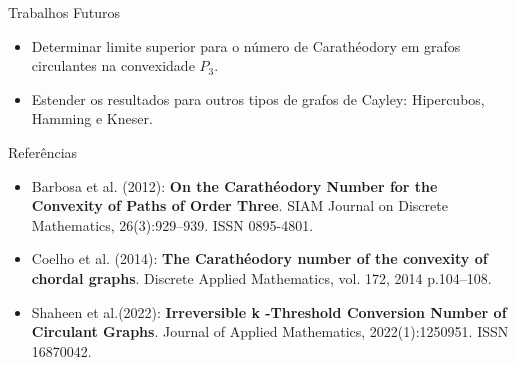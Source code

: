\documentclass{beamer}
\begin{document}
\begin{frame}{Trabalhos Futuros}
  \begin{itemize}
    \item Determinar limite superior para o número de Carathéodory em grafos circulantes na convexidade $P_3$.
    \item Estender os resultados para outros tipos de grafos de Cayley: Hipercubos, Hamming e Kneser.
  \end{itemize}

\end{frame}

\begin{frame}{Referências}
          \begin{itemize}
            \item{Barbosa et al. (2012): \textbf{On
                              the Carathéodory Number for the Convexity of Paths of Order Three}. SIAM Journal on Discrete
                        Mathematics, 26(3):929–939. ISSN 0895-4801.}
            \item{Coelho et al. (2014)}: \textbf{The Carathéodory number of the convexity of chordal graphs}. Discrete Applied Mathematics, vol. 172, 2014 p.104--108.

            \item{Shaheen et al.(2022): \textbf{Irreversible k -Threshold Conversion Number of
                              Circulant Graphs}. Journal of Applied Mathematics, 2022(1):1250951. ISSN 16870042.}
      \end{itemize}
\end{frame}
\end{document}
